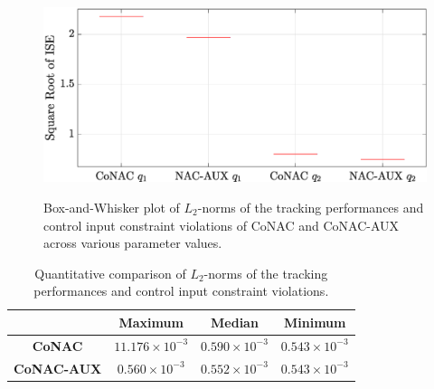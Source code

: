 \documentclass[final,5p,times,twocolumn,authoryear]{elsarticle}
\newcommand*{\figSizeOneCol}{0.98}
\begin{document}
\begin{figure}[!t]      
    \centering
    {\includegraphics[width=\figSizeOneCol\linewidth]{
        src/measurement/figures/Fig11.eps
    }}
\caption{Box-and-Whisker plot of $L_2$-norms of the tracking performances and control input constraint violations of CoNAC and CoNAC-AUX across various parameter values.}
    \label{fig:ctrl:result:var}
\end{figure}


\begin{table}[!t]
    \renewcommand{\arraystretch}{1.3}
    \caption{Quantitative comparison of $L_2$-norms of the tracking performances and control input constraint violations.}
    \centering
    \begin{tabular}{c c c c}
    \hline
        \!&\!Maximum\!&\!Median\!&\!Minimum\!\\
    \hline
    \hline
    \textbf{CoNAC}\!&\!$11.176\!\times\!10^{-3}$\!&\!$0.590\!\times\!10^{-3}$\!&\!$0.543\!\times\!10^{-3}$ \\
    \hline
    \textbf{CoNAC-AUX}\!&\!$0.560\!\times\!10^{-3}$\!&\!$0.552\!\times\!10^{-3}$\!&\!$0.543\!\times\!10^{-3}$ \\
    \hline
    \end{tabular}
    \label{table:ctrl:result:var}
\end{table}
\end{document}
